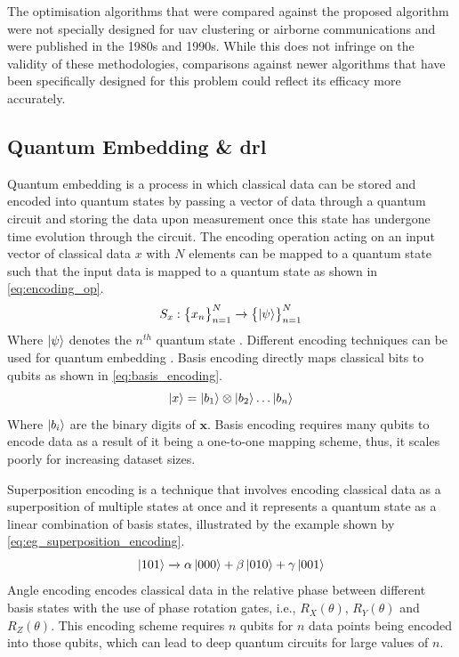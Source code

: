The optimisation algorithms that were compared against the proposed algorithm were not specially designed for \acrshort{uav} clustering or airborne communications and were published in the 1980s and 1990s. 
While this does not infringe on the validity of these methodologies, comparisons against newer algorithms that have been specifically designed for this problem could reflect its efficacy more accurately. 

\subsection{Quantum Embedding \& \texorpdfstring{\acrshort{drl}}{DRL}}
Quantum embedding is a process in which classical data can be stored and encoded into quantum states by passing a vector of data through a quantum circuit and storing the data upon measurement once this state has undergone time evolution through the circuit. 
The encoding operation acting on an input vector of classical data $x$ with $N$ elements can be mapped to a quantum state such that the input data is mapped to a quantum state as shown in \ref{eq:encoding_op}.
\begin{equation} \label{eq:encoding_op}
    S_x : \begin{Bmatrix}
        x_n
    \end{Bmatrix}_{n=1}^{N} \xrightarrow[]{} \begin{Bmatrix}
        \ket{\psi}
    \end{Bmatrix}_{n=1}^{N}
\end{equation}
Where $\ket{\psi}$ denotes the $n^{th}$ quantum state \cite{silvirianti_layerwise_2024}. 
Different encoding techniques can be used for quantum embedding \cite{munikote_comparing_2024, rath_quantum_2023}.
Basis encoding directly maps classical bits to qubits as shown in \ref{eq:basis_encoding}. 
\begin{equation} \label{eq:basis_encoding}
    \ket{x} = \ket{b_1} \otimes \ket{b_2} \dots \ket{b_n}
\end{equation}
Where $\ket{b_i}$ are the binary digits of $\textbf{x}$. 
Basis encoding requires many qubits to encode data as a result of it being a one-to-one mapping scheme, thus, it scales poorly for increasing dataset sizes. 

Superposition encoding is a technique that involves encoding classical data as a superposition of multiple states at once and it represents a quantum state as a linear combination of basis states, illustrated by the example shown by \ref{eq:eg_superposition_encoding}. 
\begin{equation} \label{eq:eg_superposition_encoding}
    \ket{101} \xrightarrow{} \alpha\ket{000} + \beta\ket{010} + \gamma\ket{001}
\end{equation}
Angle encoding encodes classical data in the relative phase between different basis states with the use of phase rotation gates, i.e., $R_{X}(\theta)$, $R_{Y}(\theta)$ and $R_{Z}(\theta)$. 
This encoding scheme requires $n$ qubits for $n$ data points being encoded into those qubits, which can lead to deep quantum circuits for large values of $n$.

